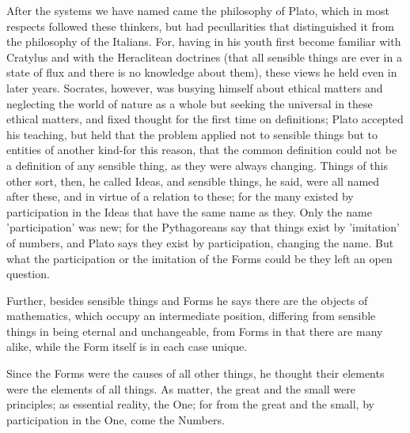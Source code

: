 \documentclass{article}
\begin{document}
After the systems we have named came the philosophy of Plato, which in most respects followed these thinkers, but had pecullarities that distinguished it from the philosophy of the Italians. For, having in his youth first become familiar with Cratylus and with the Heraclitean doctrines (that all sensible things are ever in a state of flux and there is no knowledge about them), these views he held even in later years. Socrates, however, was busying himself about ethical matters and neglecting the world of nature as a whole but seeking the universal in these ethical matters, and fixed thought for the first time on definitions; Plato accepted his teaching, but held that the problem applied not to sensible things but to entities of another kind-for this reason, that the common definition could not be a definition of any sensible thing, as they were always changing. Things of this other sort, then, he called Ideas, and sensible things, he said, were all named after these, and in virtue of a relation to these; for the many existed by participation in the Ideas that have the same name as they. Only the name 'participation' was new; for the Pythagoreans say that things exist by 'imitation' of numbers, and Plato says they exist by participation, changing the name. But what the participation or the imitation of the Forms could be they left an open question.

Further, besides sensible things and Forms he says there are the objects of mathematics, which occupy an intermediate position, differing from sensible things in being eternal and unchangeable, from Forms in that there are many alike, while the Form itself is in each case unique.

Since the Forms were the causes of all other things, he thought their elements were the elements of all things. As matter, the great and the small were principles; as essential reality, the One; for from the great and the small, by participation in the One, come the Numbers.
\end{document}
